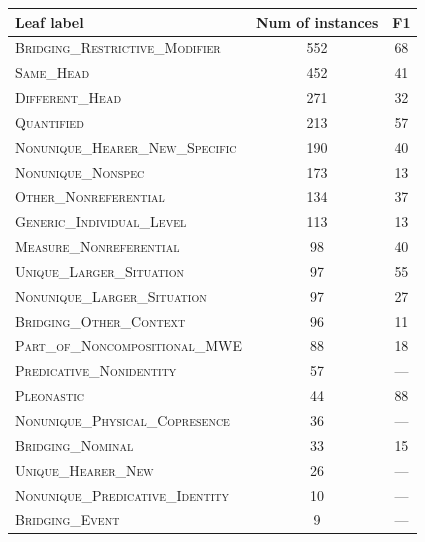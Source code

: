 \documentclass[landscape,final]{baposter}
\begin{document}
\begin{poster}
{\begin{center}\small
\smaller [.5]
\begin{tabular}{|l|c|c|}
 \multicolumn{1}{p{9em}}{Leaf label} & \multicolumn{1}{c}{Num of instances} & \multicolumn{1}{c}{F1}	\\				
       \hline %
\textsc{Bridging\_Restrictive\_Modifier} & 552 & 68 \\
\textsc{Same\_Head} & 452 & 41 \\
\textsc{Different\_Head} & 271 & 32 \\
\textsc{Quantified} & 213 & 57 \\
\textsc{Nonunique\_Hearer\_New\_Specific} & 190 & 40 \\
\textsc{Nonunique\_Nonspec} & 173 & 13 \\
\textsc{Other\_Nonreferential} & 134 & 37 \\
\textsc{Generic\_Individual\_Level} & 113 & 13 \\
\textsc{Measure\_Nonreferential} & 98 & 40 \\
\textsc{Unique\_Larger\_Situation} & 97 & 55 \\
\textsc{Nonunique\_Larger\_Situation} & 97 & 27 \\
\textsc{Bridging\_Other\_Context} & 96 & 11 \\
\textsc{Part\_of\_Noncompositional\_MWE} & 88 & 18 \\
\textsc{Predicative\_Nonidentity} & 57 & --- \\
\textsc{Pleonastic} & 44 & 88 \\
\textsc{Nonunique\_Physical\_Copresence} & 36 & --- \\
\textsc{Bridging\_Nominal} & 33 & 15 \\
\textsc{Unique\_Hearer\_New} & 26 & --- \\
\textsc{Nonunique\_Predicative\_Identity} & 10 & --- \\
\textsc{Bridging\_Event} & 9 & --- \\
			\hline%
\end{tabular}
\end{center}
}
\end{poster}
\end{document}
